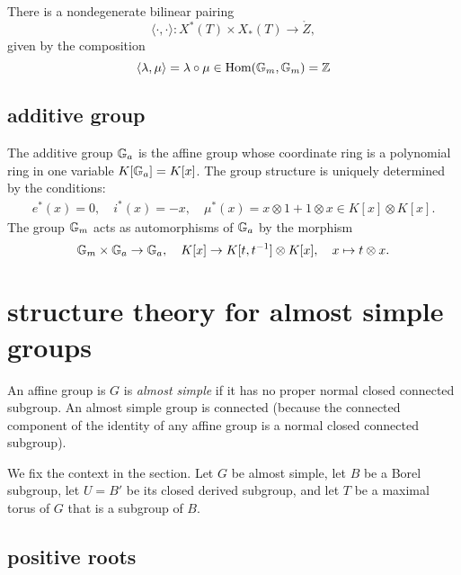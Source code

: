 There is a nondegenerate bilinear pairing
\[
\langle\cdot,\cdot\rangle:X^*(T)\times X_*(T)\to \ring{Z},
\]
given by the composition
\[
\langle \lambda,\mu\rangle =
\lambda\circ\mu \in \text{Hom}({\Bbb G}_m,{\Bbb G}_m) = {\Bbb Z}
\]




\subsection{additive group}\label{subsection-additive-group}

The additive group ${\Bbb G}_a$ is the affine group whose coordinate ring is
a polynomial ring in one variable $K[{\Bbb G}_a] = K[x]$.  The group
structure is uniquely determined by the conditions:
\begin{align*}
  e^*(x)=0,\quad i^*(x)= -x,\quad
  \mu^*(x) = x\otimes 1 + 1\otimes x\in K[x]\otimes K[x].
\end{align*}
The group ${\Bbb G}_m$ acts as automorphisms of ${\Bbb G}_a$ by the morphism
\[
{\Bbb G}_m\times {\Bbb G}_a\to {\Bbb G}_a,\quad K[x]\to K[t,t^{-1}]\otimes K[x],
\quad x\mapsto t\otimes x.
\]

\section{structure theory for almost simple groups}

An affine group is $G$ is {\it almost simple} if it has no proper normal
closed connected subgroup.  An almost simple group is connected
(because the connected component of the identity of any affine group
is a normal closed connected subgroup).

We fix the context in the section.  Let $G$ be almost simple, let $B$
be a Borel subgroup, let $U = B'$ be its closed derived subgroup, and
let $T$ be a maximal torus of $G$ that is a subgroup of $B$.

\subsection{positive roots}

